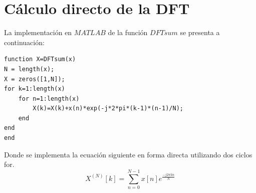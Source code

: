 \documentclass[letterpaper,onecolumn,10pt,journal,final]{IEEEtran}
\begin{document}
%
%
\section{Cálculo directo de la DFT}
La implementación en $MATLAB$ de la función $DFTsum$ se presenta a continuación:
\begin{lstlisting}
function X=DFTsum(x) 
N = length(x);
X = zeros([1,N]);
for k=1:length(x)
    for n=1:length(x)
        X(k)=X(k)+x(n)*exp(-j*2*pi*(k-1)*(n-1)/N);
    end
end
end
\end{lstlisting}
Donde se implementa la ecuación siguiente en forma directa utilizando dos ciclos for.
\begin{equation*}
    X^{(N)}[k] = \sum _{n = 0} ^{N-1} x[n] e ^{\frac{-j 2 \pi k n}{N}}
\end{equation*}
\end{document}
